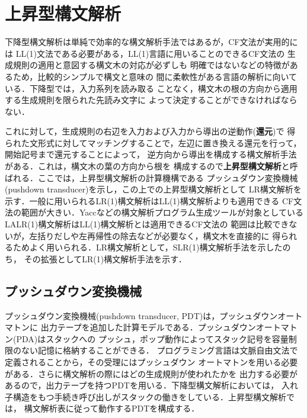 \documentclass[a4j,dvipdfmx]{jbook}
\begin{document}
\section{上昇型構文解析}

下降型構文解析は単純で効率的な構文解析手法ではあるが，CF文法が実用的には
LL(1)文法である必要がある，LL(1)言語に用いることのできるCF文法の
生成規則の適用と意図する構文木の対応が必ずしも
明確ではないなどの特徴があるため，比較的シンプルで構文と意味の
間に柔軟性がある言語の解析に向いている．下降型では，入力系列を読み取る
ことなく，構文木の根の方向から適用する生成規則を限られた先読み文字に
よって決定することができなければならない．

これに対して，生成規則の右辺を入力および入力から導出の逆動作({\bf 還元})で
得られた文形式に対してマッチングすることで，左辺に置き換える還元を行って，
開始記号まで還元することによって，
逆方向から導出を構成する構文解析手法がある．これは，構文木の葉の方向から根を
構成するので{\bf 上昇型構文解析}と呼ばれる．ここでは，上昇型構文解析の計算機構である
プッシュダウン変換機械(pushdown transducer)を示し，この上での上昇型構文解析として
LR構文解析を示す．一般に用いられるLR(1)構文解析はLL(1)構文解析よりも適用できる
CF文法の範囲が大きい．Yaccなどの構文解析プログラム生成ツールが対象としている
LALR(1)構文解析はLL(1)構文解析とは適用できるCF文法の
範囲は比較できないが，左括りだしや左再帰性の除去などが必要なく，構文木を直接的に
得られるためよく用いられる．LR構文解析として，SLR(1)構文解析手法を示したのち，
その拡張としてLR(1)構文解析手法を示す．

\subsection{プッシュダウン変換機械}

プッシュダウン変換機械(pushdown transducer, PDT)は，プッシュダウンオートマトンに
出力テープを追加した計算モデルである．プッシュダウンオートマトン(PDA)はスタックへの
プッシュ，ポップ動作によってスタック記号を容量制限のない記憶に格納することができる．
プログラミング言語は文脈自由文法で定義されることから，その受理にはプッシュダウン
オートマトンを用いる必要がある．さらに構文解析の際にはどの生成規則が使われたかを
出力する必要があるので，出力テープを持つPDTを用いる．下降型構文解析においては，
入れ子構造をもつ手続き呼び出しがスタックの働きをしている．上昇型構文解析では，
構文解析表に従って動作するPDTを構成する．
\end{document}
